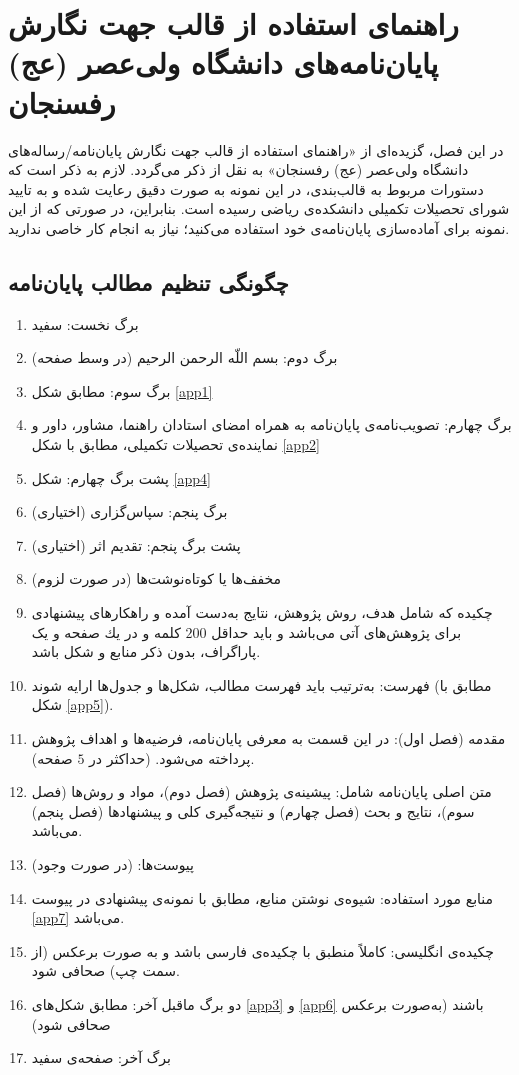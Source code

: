 \chapter[راهنمای استفاده از قالب \lr{\texttt{vruthesis}} جهت نگارش]{راهنمای استفاده از قالب  جهت نگارش پایان‌نامه‌های دانشگاه ولی‌عصر (عج) رفسنجان}
	در این فصل، گزیده‌ای از «راهنمای استفاده از قالب  جهت نگارش پایان‌نامه/رساله‌های دانشگاه ولی‌عصر (عج) رفسنجان» به نقل از \cite{vru_grad_rules} ذکر می‌گردد. لازم به ذکر است که دستورات مربوط به قالب‌بندی، در این نمونه به صورت دقیق رعایت شده و به تایید شورای تحصیلات تکمیلی دانشکده‌ی ریاضی رسیده است. بنابراین، در صورتی که از این نمونه برای آماده‌سازی پایان‌نامه‌ی خود استفاده می‌کنید؛ نیاز به انجام کار خاصی ندارید.
	\section{چگونگی تنظیم مطالب پایان‌نامه}
		\begin{enumerate}
			\item برگ نخست: سفید
			\item برگ دوم: بسم اللّه الرحمن الرحیم (در وسط صفحه)
			\item برگ سوم: مطابق شکل \ref{app1}
			\item برگ چهارم: تصویب‌نامه‌ی پایان‌نامه به همراه امضای استادان راهنما، مشاور، داور و نماینده‌ی تحصیلات تکمیلی، مطابق با شکل \ref{app2}
			\item پشت برگ چهارم: شکل \ref{app4}
			\item برگ پنجم: سپاس‌گزاری (اختیاری)
			\item پشت برگ پنجم: تقدیم اثر (اختیاری)
			\item مخفف‌ها یا کوتاه‌نوشت‌ها  (در صورت لزوم)
			\item چکیده که شامل هدف، روش پژوهش، نتایج به‌دست آمده و راهکار‌های پیشنهادی برای پژوهش‌های آتی می‌باشد و باید حداقل $200$ کلمه و در یك صفحه و یک پاراگراف، بدون ذکر منابع و شكل باشد. 
			\item فهرست: به‌ترتیب باید فهرست مطالب، شکل‌ها و جدول‌ها ارایه شوند (مطابق با شکل \ref{app5}).
			\item مقدمه (فصل اول): در این قسمت به معرفی پایان‌نامه، فرضیه‌ها و اهداف پژوهش پرداخته می‌شود. (حداکثر در $5$ صفحه).
			\item متن اصلی پایان‌نامه شامل: پیشینه‌ی پژوهش (فصل دوم)، مواد و روش‌ها (فصل سوم)، نتایج و بحث (فصل چهارم) و نتیجه‌گیری کلی و پیشنهادها (فصل پنجم) می‌باشد.
			\item پیوست‌ها: (در صورت وجود)
			\item منابع مورد استفاده: شیوه‌ی نوشتن منابع، مطابق با نمونه‌ی پیشنهادی در پیوست‌ \ref{app7} می‌باشد.
			\item چکیده‌ی انگلیسی: کاملاً منطبق با چکیده‌ی فارسی باشد و به صورت برعکس (از سمت چپ) صحافی شود.
			\item دو برگ ماقبل آخر: مطابق شکل‌های \ref{app3} و \ref{app6} باشند (به‌صورت برعکس صحافی شود)
			\item برگ آخر: صفحه‌ی سفید
		\end{enumerate}
		
